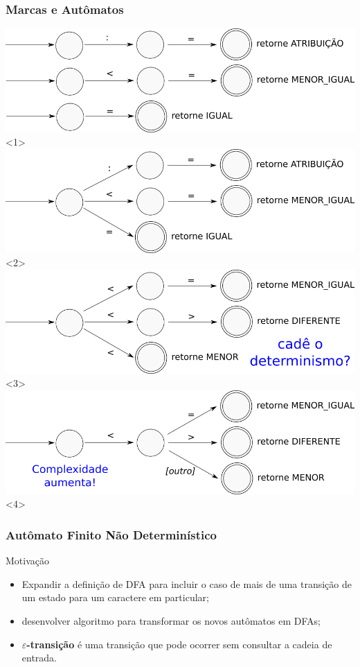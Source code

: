 \documentclass[table]{beamer}
\begin{document}
\begin{frame}
   \frametitle{Marcas e Autômatos}
   \includegraphics[width=\linewidth,height=\textheight,keepaspectratio]{figuras/menorigual00.png}<1>
   \includegraphics[width=\linewidth,height=\textheight,keepaspectratio]{figuras/menorigual01.png}<2>
   \includegraphics[width=\linewidth,height=\textheight,keepaspectratio]{figuras/menorigual02.png}<3>
   \includegraphics[width=\linewidth,height=\textheight,keepaspectratio]{figuras/menorigual03.png}<4>
\end{frame}

\begin{frame}
   \frametitle{Autômato Finito Não Determinístico}
   \begin{block}{Motivação}
      \begin{itemize}
         \item Expandir a definição de DFA para incluir o caso de mais de uma transição de um estado para um caractere em particular;
	 \item desenvolver algoritmo para transformar os novos autômatos em DFAs;
	 \item \textbf{$\varepsilon$-transição} é uma transição que pode ocorrer sem consultar a cadeia de entrada.
      \end{itemize}
   \end{block}
\end{frame}
\end{document}
